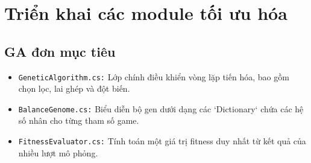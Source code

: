 \section{Triển khai các module tối ưu hóa}
\subsection{GA đơn mục tiêu}
\begin{itemize}
    \item \texttt{GeneticAlgorithm.cs:} Lớp chính điều khiển vòng lặp tiến hóa, bao gồm chọn lọc, lai ghép và đột biến.
    \item \texttt{BalanceGenome.cs:} Biểu diễn bộ gen dưới dạng các `Dictionary` chứa các hệ số nhân cho từng tham số game.
    \item \texttt{FitnessEvaluator.cs:} Tính toán một giá trị fitness duy nhất từ kết quả của nhiều lượt mô phỏng.
\end{itemize}
